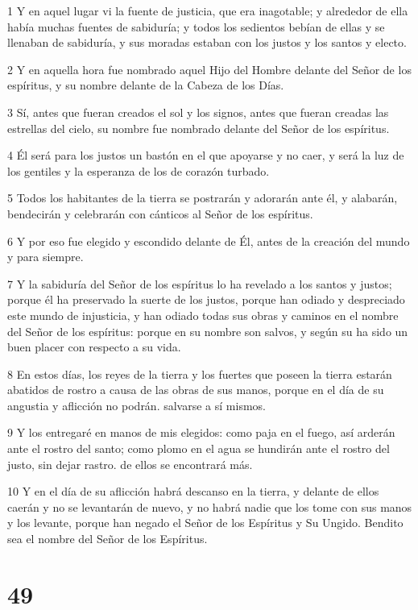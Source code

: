 \par 1 Y en aquel lugar vi la fuente de justicia, que era inagotable; y alrededor de ella había muchas fuentes de sabiduría; y todos los sedientos bebían de ellas y se llenaban de sabiduría, y sus moradas estaban con los justos y los santos y electo.
\par 2 Y en aquella hora fue nombrado aquel Hijo del Hombre delante del Señor de los espíritus, y su nombre delante de la Cabeza de los Días.
\par 3 Sí, antes que fueran creados el sol y los signos, antes que fueran creadas las estrellas del cielo, su nombre fue nombrado delante del Señor de los espíritus.
\par 4 Él será para los justos un bastón en el que apoyarse y no caer, y será la luz de los gentiles y la esperanza de los de corazón turbado.
\par 5 Todos los habitantes de la tierra se postrarán y adorarán ante él, y alabarán, bendecirán y celebrarán con cánticos al Señor de los espíritus.
\par 6 Y por eso fue elegido y escondido delante de Él, antes de la creación del mundo y para siempre.
\par 7 Y la sabiduría del Señor de los espíritus lo ha revelado a los santos y justos; porque él ha preservado la suerte de los justos, porque han odiado y despreciado este mundo de injusticia, y han odiado todas sus obras y caminos en el nombre del Señor de los espíritus: porque en su nombre son salvos, y según su ha sido un buen placer con respecto a su vida.
\par 8 En estos días, los reyes de la tierra y los fuertes que poseen la tierra estarán abatidos de rostro a causa de las obras de sus manos, porque en el día de su angustia y aflicción no podrán. salvarse a sí mismos.
\par 9 Y los entregaré en manos de mis elegidos: como paja en el fuego, así arderán ante el rostro del santo; como plomo en el agua se hundirán ante el rostro del justo, sin dejar rastro. de ellos se encontrará más.
\par 10 Y en el día de su aflicción habrá descanso en la tierra, y delante de ellos caerán y no se levantarán de nuevo, y no habrá nadie que los tome con sus manos y los levante, porque han negado el Señor de los Espíritus y Su Ungido. Bendito sea el nombre del Señor de los Espíritus.

\chapter{49}

